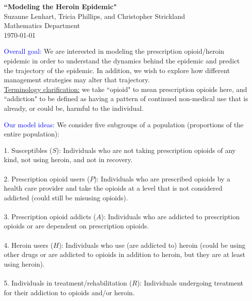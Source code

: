 \documentclass[12pt]{article}
\begin{document}
\begin{center}
\textbf{``Modeling the Heroin Epidemic"} \\ 
Suzanne Lenhart, Tricia Phillips, and Christopher Strickland \\
Mathematics Department \\
\today \\
\end{center}

\textcolor{blue}{Overall goal:} We are interested in modeling the prescription opioid/heroin epidemic in order to understand the dynamics behind the epidemic and predict the trajectory of the epidemic. In addition, we wish to explore how different management strategies may alter that trajectory. \\
\underline{Terminology clarification:} we take ``opioid" to mean prescription opioids here, and ``addiction" to be defined as having a pattern of continued non-medical use that is already, or could be, harmful to the individual. 

\textcolor{blue}{Our model ideas:} 
We consider five subgroups of a population (proportions of the entire population): 

1. Susceptibles ($S$): Individuals who are not taking prescription opioids of any kind, not using heroin, and not in recovery. \\ \\
2. Prescription opioid users ($P$): Individuals who are prescribed opioids by a health care provider and take the opioids at a level that is not considered addicted (could still be misusing opioids). \\ \\
3. Prescription opioid addicts ($A$): Individuals who are addicted to prescription opioids or are dependent on prescription opioids. \\ \\
4. Heroin users ($H$): Individuals who use (are addicted to) heroin (could be using other drugs or are addicted to opioids in addition to heroin, but they are at least using heroin). \\ \\
5. Individuals in treatment/rehabilitation ($R$): Individuals undergoing treatment for their addiction to opioids and/or heroin. 
\end{document}
